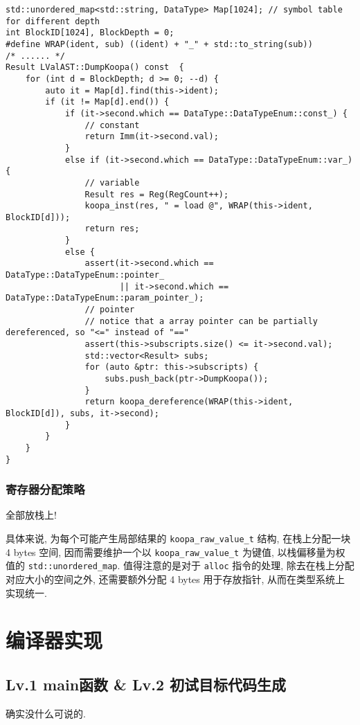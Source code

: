 \documentclass[8pt]{article}
\theoremstyle{compact}
\begin{document}
\begin{verbatim}
std::unordered_map<std::string, DataType> Map[1024]; // symbol table for different depth
int BlockID[1024], BlockDepth = 0;
#define WRAP(ident, sub) ((ident) + "_" + std::to_string(sub))
/* ...... */
Result LValAST::DumpKoopa() const  {
    for (int d = BlockDepth; d >= 0; --d) {
        auto it = Map[d].find(this->ident);
        if (it != Map[d].end()) {
            if (it->second.which == DataType::DataTypeEnum::const_) {
                // constant
                return Imm(it->second.val);
            }
            else if (it->second.which == DataType::DataTypeEnum::var_) {
                // variable
                Result res = Reg(RegCount++);
                koopa_inst(res, " = load @", WRAP(this->ident, BlockID[d]));
                return res;
            }
            else {
                assert(it->second.which == DataType::DataTypeEnum::pointer_
                       || it->second.which == DataType::DataTypeEnum::param_pointer_);
                // pointer
                // notice that a array pointer can be partially dereferenced, so "<=" instead of "=="
                assert(this->subscripts.size() <= it->second.val);
                std::vector<Result> subs;
                for (auto &ptr: this->subscripts) {
                    subs.push_back(ptr->DumpKoopa());
                }
                return koopa_dereference(WRAP(this->ident, BlockID[d]), subs, it->second);                
            }
        }
    }
}
\end{verbatim}

\subsubsection{寄存器分配策略}
全部放栈上!

具体来说, 为每个可能产生局部结果的 \texttt{koopa\_raw\_value\_t} 结构, 在栈上分配一块 4 bytes 空间, 因而需要维护一个以 \texttt{koopa\_raw\_value\_t} 为键值, 以栈偏移量为权值的 \texttt{std::unordered\_map}. 值得注意的是对于 \texttt{alloc} 指令的处理, 除去在栈上分配对应大小的空间之外, 还需要额外分配 4 bytes 用于存放指针, 从而在类型系统上实现统一.

\section{编译器实现}
\subsection{Lv.1 main函数  \& Lv.2 初试目标代码生成}
确实没什么可说的.
\end{document}
